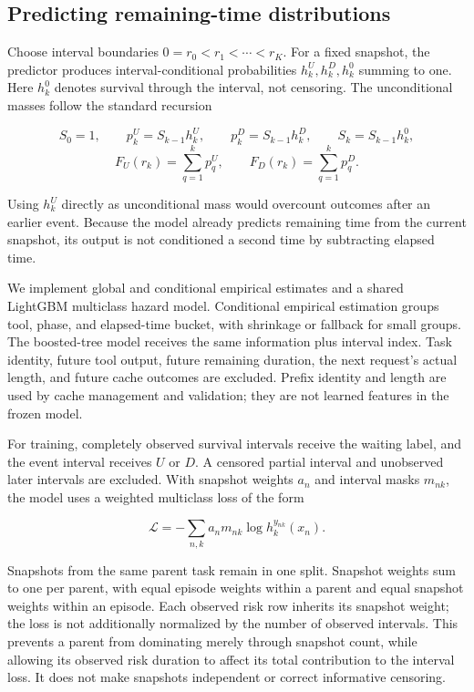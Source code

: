 \documentclass[sigconf, screen, review]{acmart}
\begin{document}
\subsection{Predicting remaining-time
distributions}\label{predicting-remaining-time-distributions}

Choose interval boundaries \(0=r_0<r_1<\cdots<r_K\). For a fixed
snapshot, the predictor produces interval-conditional probabilities
\(h_k^U,h_k^D,h_k^0\) summing to one. Here \(h_k^0\) denotes survival
through the interval, not censoring. The unconditional masses follow the
standard recursion

\[
S_0=1,\qquad p_k^U=S_{k-1}h_k^U,\qquad
p_k^D=S_{k-1}h_k^D,\qquad S_k=S_{k-1}h_k^0,
\] \[
F_U(r_k)=\sum_{q=1}^{k}p_q^U,\qquad
F_D(r_k)=\sum_{q=1}^{k}p_q^D.
\]

Using \(h_k^U\) directly as unconditional mass would overcount outcomes
after an earlier event. Because the model already predicts remaining
time from the current snapshot, its output is not conditioned a second
time by subtracting elapsed time.

We implement global and conditional empirical estimates and a shared
LightGBM multiclass hazard model. Conditional empirical estimation
groups tool, phase, and elapsed-time bucket, with shrinkage or fallback
for small groups. The boosted-tree model receives the same information
plus interval index. Task identity, future tool output, future remaining
duration, the next request's actual length, and future cache outcomes
are excluded. Prefix identity and length are used by cache management
and validation; they are not learned features in the frozen model.

For training, completely observed survival intervals receive the waiting
label, and the event interval receives \(U\) or \(D\). A censored
partial interval and unobserved later intervals are excluded. With
snapshot weights \(a_n\) and interval masks \(m_{nk}\), the model uses a
weighted multiclass loss of the form

\[
\mathcal L=-\sum_{n,k}a_n m_{nk}\log h_k^{y_{nk}}(x_n).
\]

Snapshots from the same parent task remain in one split. Snapshot
weights sum to one per parent, with equal episode weights within a
parent and equal snapshot weights within an episode. Each observed risk
row inherits its snapshot weight; the loss is not additionally
normalized by the number of observed intervals. This prevents a parent
from dominating merely through snapshot count, while allowing its
observed risk duration to affect its total contribution to the interval
loss. It does not make snapshots independent or correct informative
censoring.
\end{document}
